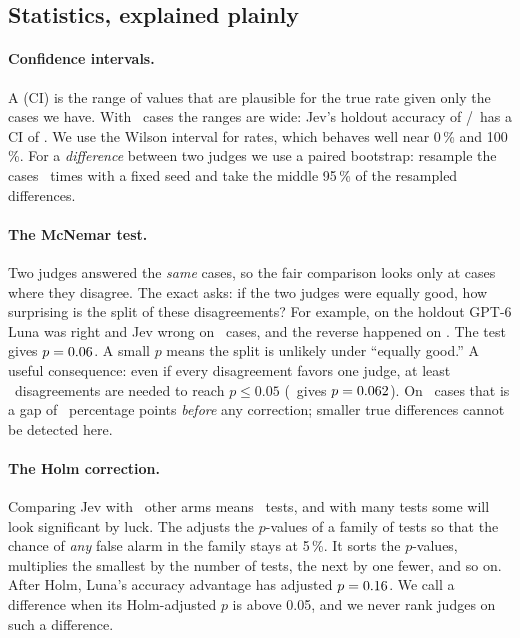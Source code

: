 \subsection{Statistics, explained plainly}\label{sec:stats}

\paragraph{Confidence intervals.} A  (CI) is the range of values that
are plausible for the true rate given only the cases we have. With \HoldN\ cases the ranges are wide:
Jev's holdout accuracy of \JevHoldAccK/\HoldN\ has a CI of \JevHoldAccCI. We use the Wilson interval for
rates, which behaves well near 0\,\% and 100\,\%. For a \emph{difference} between two judges we use a
paired bootstrap: resample the cases \BootstrapB\ times with a fixed seed and take the middle 95\,\% of
the resampled differences.

\paragraph{The McNemar test.} Two judges answered the \emph{same} cases, so the fair comparison looks
only at cases where they disagree. The exact  asks: if the two judges were equally
good, how surprising is the split of these disagreements? For example, on the holdout GPT-6 Luna was
right and Jev wrong on \LunaHoldRAccCandOnly\ cases, and the reverse happened on
\LunaHoldRAccBaseOnly. The test gives $p = 0.06$. A small $p$ means the split is unlikely
under ``equally good.'' A useful consequence: even if every disagreement favors one judge, at least
\MinDiscordant\ disagreements are needed to reach $p \le 0.05$ (\MinDiscordantPrev\ gives
$p = 0.062$). On \HoldN\ cases that is a gap of \HoldMinDetectPts\ percentage points
\emph{before} any correction; smaller true differences cannot be detected here.

\paragraph{The Holm correction.} Comparing Jev with \RuleOneFamilyHold\ other arms means
\RuleOneFamilyHold\ tests, and with many tests some will look significant by luck. The
 adjusts the $p$-values of a family of tests so that the chance of \emph{any}
false alarm in the family stays at 5\,\%. It sorts the $p$-values, multiplies the smallest by the number
of tests, the next by one fewer, and so on. After Holm, Luna's accuracy advantage has adjusted
$p = 0.16$. We call a difference  when its Holm-adjusted $p$ is above
0.05, and we never rank judges on such a difference.

